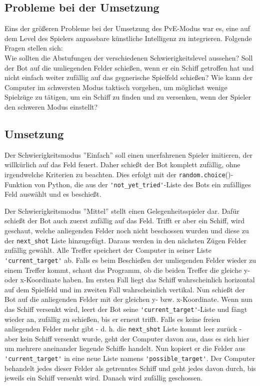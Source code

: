 \documentclass{article}
\begin{document}
\subsection{Probleme bei der Umsetzung}
    Eins der größeren Probleme bei der Umsetzung des PvE-Modus war es, eine auf dem Level des Spielers anpassbare künstliche Intelligenz zu integrieren. Folgende Fragen stellen sich:\\
    Wie sollten die Abstufungen der verschiedenen Schwierigkeitslevel aussehen? Soll der Bot auf die umliegenden Felder schießen, wenn er ein Schiff getroffen hat und nicht einfach weiter zufällig auf das gegnerische Spielfeld schießen? Wie kann der Computer im schwersten Modus taktisch vorgehen, um möglichst wenige Spielzüge zu tätigen, um ein Schiff zu finden und zu versenken, wenn der Spieler den schweren Modus einstellt?

\subsection{Umsetzung}
    Der Schwierigkeitsmodus ''Einfach'' soll einen unerfahrenen Spieler imitieren, der willkürlich auf das Feld feuert. Daher schießt der Bot komplett zufällig, ohne irgendwelche Kriterien zu beachten. Dies erfolgt mit der \verb$random.choice$()-Funktion von Python, die aus der \verb$'not_yet_tried'$-Liste des Bots ein zufälliges Feld auswählt und es beschießt.\\

\par
    Der Schwierigkeitsmodus ''Mittel'' stellt einen Gelegenheitsspieler dar. Dafür schießt der Bot auch zuerst zufällig auf das Feld. Trifft er aber ein Schiff, wird geschaut, welche anliegenden Felder noch nicht beschossen wurden und diese zu der \verb$next_shot$ Liste hinzugefügt. Daraus werden in den nächsten Zügen Felder zufällig gewählt. Alle Treffer speichert der Computer in seiner Liste \verb$'current_target'$ ab. Falls es beim Beschießen der umliegenden Felder wieder zu einem Treffer kommt, schaut das Programm, ob die beiden Treffer die gleiche y- oder x-Koordinate haben. Im ersten Fall liegt das Schiff wahrscheinlich horizontal auf dem Spielfeld und im zweiten Fall wahrscheinlich vertikal. Nun schießt der Bot auf die anliegenden Felder mit der gleichen y- bzw. x-Koordinate. Wenn nun das Schiff versenkt wird, leert der Bot seine \verb$'current_target'$-Liste und fängt wieder an, zufällig zu schießen, bis er erneut trifft. Falls es keine freien anliegenden Felder mehr gibt - d. h. die \verb$next_shot$ Liste kommt leer zurück - aber kein Schiff versenkt wurde, geht der Computer davon aus, dass es sich hier um mehrere aneinander liegende Schiffe handelt. Nun kopiert er die Felder aus \verb$'current_target'$ in eine neue Liste namens \verb$'possible_target'$. Der Computer behandelt jedes dieser Felder als getrenntes Schiff und geht jedes davon durch, bis jeweils ein Schiff versenkt wird. Danach wird zufällig geschossen.\\
\end{document}
